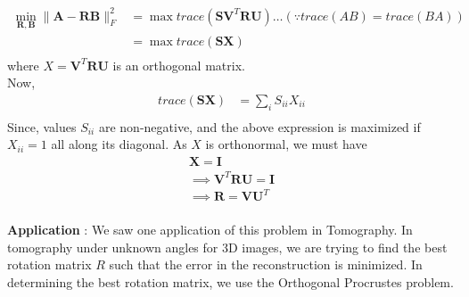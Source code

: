 \documentclass[12pt]{article}
\begin{document}
\begin{enumerate}
        \begin{equation*}
            \begin{split}
                \min_{\boldsymbol{R} , \boldsymbol{B}} \|\boldsymbol{A}-\boldsymbol{R} \boldsymbol{B}\|^2_F & =
                \max trace(\boldsymbol{S} \boldsymbol{V}^T \boldsymbol{R} \boldsymbol{U} ) \dots (\because trace(AB) = trace(BA)) \\
                & = \max trace(\boldsymbol{S} \boldsymbol{X} ) \\
            \end{split}
        \end{equation*}
where $X = \boldsymbol{V}^T \boldsymbol{R} \boldsymbol{U}$ is an orthogonal matrix. \\
Now, 
\begin{equation*}
    \begin{split}
        trace(\boldsymbol{S} \boldsymbol{X} ) & = \sum_i S_{ii} X_{ii} \\
    \end{split}
\end{equation*}
Since, values $S_{ii}$ are non-negative, and the above expression is maximized if $X_{ii} = 1$ all along its diagonal. As $X$ is orthonormal, we must have 
\begin{gather*}
    \boldsymbol{X} = \boldsymbol{I} \\
    \implies \boldsymbol{V}^T \boldsymbol{R} \boldsymbol{U} = \boldsymbol{I} \\
    \implies  \boldsymbol{R} =  \boldsymbol{V} \boldsymbol{U}^T \\
\end{gather*}

\textbf{Application} : We saw one application of this problem in Tomography. In tomography under unknown angles for 3D images, we are trying to find the best rotation matrix $R$ such that the error in the reconstruction is minimized. In determining the best rotation matrix, we use the Orthogonal Procrustes problem. \\

\end{enumerate}
\end{document}

